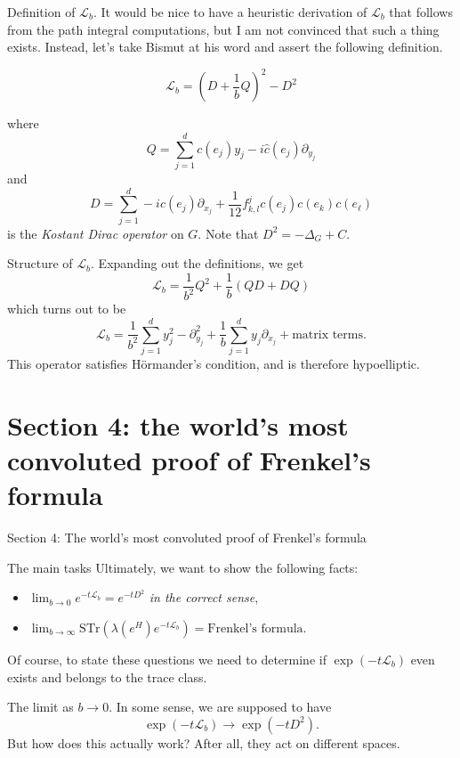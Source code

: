 \documentclass{beamer}
\numberwithin{equation}{section}
\theoremstyle{plain}
\theoremstyle{plain}
\theoremstyle{definition}
\theoremstyle{plain}
\theoremstyle{plain}
\theoremstyle{definition}
\newcommand{\Lc}{\mathcal{L}}
\newcommand{\Str}{\mathrm{STr}}
\begin{document}
\begin{frame}{Definition of $\Lc_b.$}
  It would be nice to have a heuristic derivation of $\Lc_b$ that follows from the path integral computations, but I am not convinced that such a thing exists. Instead, let's take Bismut at his word and assert the following definition.
  \begin{definition}
    \[
      \Lc_b = (D+\frac1bQ)^2-D^2
    \]
  \end{definition}
  where
  \[
    Q = \sum_{j=1}^d c(e_j)y_j-i\widehat{c}(e_j)\partial_{y_j}
  \]
  and 
  \[
    D = \sum_{j=1}^d -ic(e_j)\partial_{x_j}+\frac{1}{12}f^j_{k,l}c(e_j)c(e_k)c(e_\ell)
  \]
  is the \emph{Kostant Dirac operator} on $G.$ Note that $D^2  =-\Delta_G+C.$
\end{frame}

\begin{frame}{Structure of $\Lc_b.$}
  Expanding out the definitions, we get
  \[
    \Lc_b = \frac{1}{b^2}Q^2+\frac{1}{b}(QD+DQ)
  \]
  which turns out to be
  \[
    \Lc_b = \frac{1}{b^2}\sum_{j=1}^d y_j^2-\partial_{y_j}^2 + \frac{1}{b}\sum_{j=1}^dy_j\partial_{x_j} + \text{matrix terms.}
  \]
  \pause
  This operator satisfies H\"ormander's condition, and is therefore hypoelliptic.
\end{frame}


\section{Section 4: the world's most convoluted proof of Frenkel's formula}

\begin{frame}
  \huge{Section 4: The world's most convoluted proof of Frenkel's formula}
\end{frame}

\begin{frame}{The main tasks}
  Ultimately, we want to show the following facts:
  \begin{itemize}
    \item{} $\lim_{b\to 0} e^{-t\Lc_b} = e^{-tD^2}$ \emph{in the correct sense},
    \item{} $\lim_{b\to \infty} \Str(\lambda(e^H)e^{-t\Lc_b}) = \text{Frenkel's formula.}$
  \end{itemize}
  \pause
  Of course, to state these questions we need to determine if $\exp(-t\Lc_b)$ even exists and belongs to the trace class.
\end{frame}


\begin{frame}{The limit as $b\to 0.$}
    In some sense, we are supposed to have
    \[
      \exp(-t\Lc_b)\rightarrow \exp(-tD^2).
    \]
    But how does this actually work? After all, they act on different spaces.
\end{frame}
\end{document}

